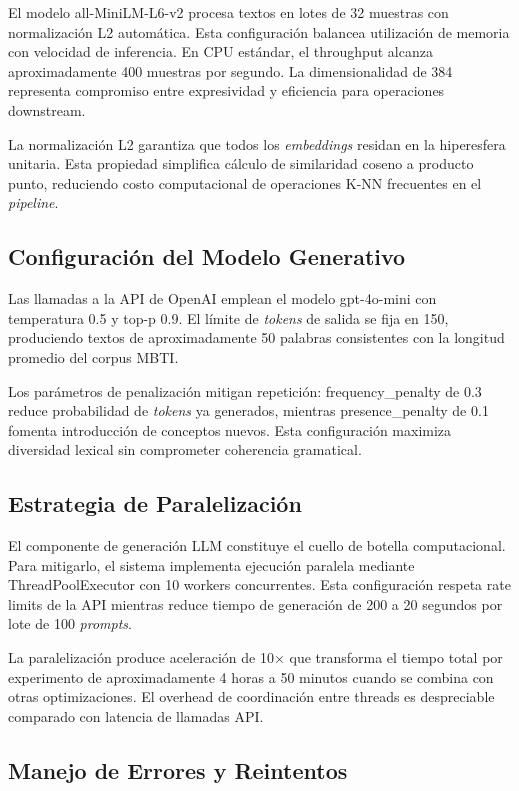 El modelo all-MiniLM-L6-v2 procesa textos en lotes de 32 muestras con normalización L2 automática. Esta configuración balancea utilización de memoria con velocidad de inferencia. En CPU estándar, el throughput alcanza aproximadamente 400 muestras por segundo. La dimensionalidad de 384 representa compromiso entre expresividad y eficiencia para operaciones downstream.

La normalización L2 garantiza que todos los \textit{embeddings} residan en la hiperesfera unitaria. Esta propiedad simplifica cálculo de similaridad coseno a producto punto, reduciendo costo computacional de operaciones K-NN frecuentes en el \textit{pipeline}.

\subsection{Configuración del Modelo Generativo}
\label{subsec:config_llm}

Las llamadas a la API de OpenAI emplean el modelo gpt-4o-mini con temperatura 0.5 y top-p 0.9. El límite de \textit{tokens} de salida se fija en 150, produciendo textos de aproximadamente 50 palabras consistentes con la longitud promedio del corpus MBTI.

Los parámetros de penalización mitigan repetición: frequency\_penalty de 0.3 reduce probabilidad de \textit{tokens} ya generados, mientras presence\_penalty de 0.1 fomenta introducción de conceptos nuevos. Esta configuración maximiza diversidad lexical sin comprometer coherencia gramatical.

\subsection{Estrategia de Paralelización}
\label{subsec:paralelizacion}

El componente de generación LLM constituye el cuello de botella computacional. Para mitigarlo, el sistema implementa ejecución paralela mediante ThreadPoolExecutor con 10 workers concurrentes. Esta configuración respeta rate limits de la API mientras reduce tiempo de generación de 200 a 20 segundos por lote de 100 \textit{prompts}.

La paralelización produce aceleración de 10$\times$ que transforma el tiempo total por experimento de aproximadamente 4 horas a 50 minutos cuando se combina con otras optimizaciones. El overhead de coordinación entre threads es despreciable comparado con latencia de llamadas API.

\subsection{Manejo de Errores y Reintentos}
\label{subsec:errores}

